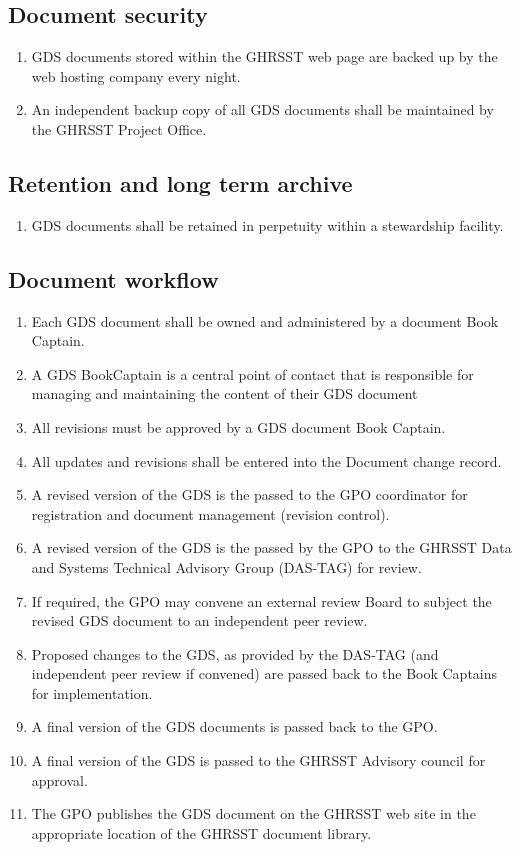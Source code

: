 \subsection{Document security}
\begin{enumerate}[noitemsep]
\item GDS documents stored within the GHRSST web page are backed up by the web hosting company every night.
\item An independent backup copy of all GDS documents shall be maintained by the GHRSST Project Office.
\end{enumerate}

\subsection{Retention and long term archive}
\begin{enumerate}[noitemsep]
\item GDS documents shall be retained in perpetuity within a stewardship facility.
\end{enumerate}

\subsection{Document workflow}
\begin{enumerate}[noitemsep]
\item Each GDS document shall be owned and administered by a document Book Captain.
\item A GDS BookCaptain is a central point of contact that is responsible for managing and maintaining the content of their GDS document
\item All revisions must be approved by a GDS document Book Captain.
\item All updates and revisions shall be entered into the Document change record.
\item A revised version of the GDS is the passed to the GPO coordinator for registration and document management (revision control).
\item A revised version of the GDS is the passed by the GPO to the GHRSST Data and Systems Technical Advisory Group (DAS-TAG) for review.
\item If required, the GPO may convene an external review Board to subject the revised GDS document to an independent peer review.
\item Proposed changes to the GDS, as provided by the DAS-TAG (and independent peer review if convened) are passed back to the Book Captains for implementation.
\item A final version of the GDS documents is passed back to the GPO.
\item A final version of the GDS is passed to the GHRSST Advisory council for approval.
\item The GPO publishes the GDS document on the GHRSST web site in the appropriate location of the GHRSST document library.
\end{enumerate}


